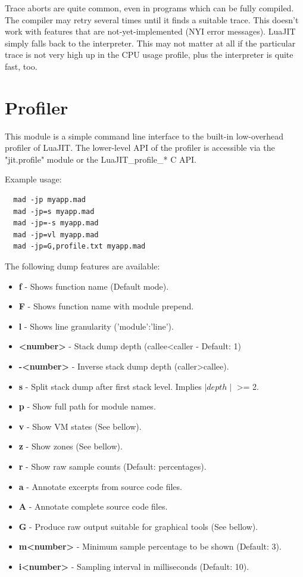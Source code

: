 Trace aborts are quite common, even in programs which
can be fully compiled. The compiler may retry several times until it
finds a suitable trace. This doesn't work with features that are
not-yet-implemented (NYI error messages). LuaJIT simply falls back to the
interpreter. This may not matter at all if the particular trace is not very high
up in the CPU usage profile, plus the interpreter is quite fast, too.


\section{Profiler}
\label{Sec:Profiler}

This module is a simple command line interface to the built-in
low-overhead profiler of LuaJIT. The lower-level API of the profiler
is accessible via the "jit.profile" module or the LuaJIT\_profile\_* C API.

Example usage:
\begin{lstlisting}
  mad -jp myapp.mad
  mad -jp=s myapp.mad
  mad -jp=-s myapp.mad
  mad -jp=vl myapp.mad
  mad -jp=G,profile.txt myapp.mad
\end{lstlisting}
The following dump features are available:
 \begin{itemize}%
  \item \textbf{f} - Shows function name (Default mode).
  \item \textbf{F} - Shows function name with module prepend.
  \item \textbf{l} - Shows line granularity ('module':'line').
  \item \textbf{\textless number\textgreater} - Stack dump depth (callee\textless caller - Default: 1)
  \item \textbf{-\textless number\textgreater} - Inverse stack dump depth (caller\textgreater callee).
  \item \textbf{s} - Split stack dump after first stack level. Implies $\mid depth\mid$
  \textgreater= 2.
  \item \textbf{p} - Show full path for module names.
  \item \textbf{v} - Show VM states (See bellow).
  \item \textbf{z} - Show zones (See bellow).
  \item \textbf{r} - Show raw sample counts (Default: percentages).
  \item \textbf{a} - Annotate excerpts from source code files.
  \item \textbf{A} - Annotate complete source code files.
  \item \textbf{G} - Produce raw output suitable for graphical tools (See bellow).
  \item \textbf{m\textless number\textgreater} - Minimum sample percentage to be shown (Default: 3).
  \item \textbf{i\textless number\textgreater} - Sampling interval in milliseconds (Default: 10).
 \end{itemize}

